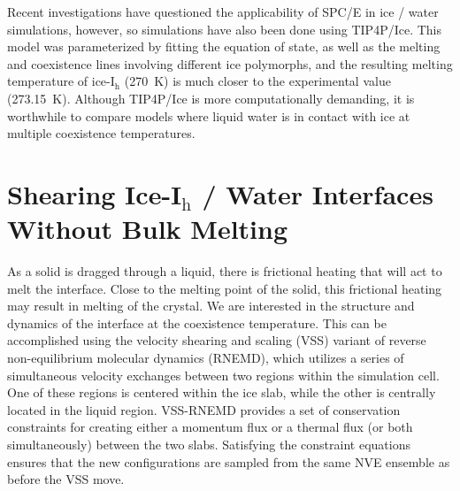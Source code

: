 Recent investigations have questioned the applicability of SPC/E in
ice / water
simulations,\cite{Vega2005c,Vega2011a,Gladich2012,Gallo2016} however,
so simulations have also been done using TIP4P/Ice.\cite{Abascal2005}
This model was parameterized by fitting the equation of state, as well
as the melting and coexistence lines involving different
ice polymorphs, and the resulting melting temperature of
ice-I$_\mathrm{h}$ (270~K) is much closer to the experimental
value (273.15~K).\cite{Abascal2005} Although TIP4P/Ice is more computationally
demanding, it is worthwhile to compare models where liquid water is in
contact with ice at multiple coexistence temperatures.

\section{Shearing Ice-I$_\mathrm{h}$ / Water Interfaces Without Bulk Melting}

As a solid is dragged through a liquid, there is frictional heating
that will act to melt the interface.  Close to the melting point of the
solid, this frictional heating may result in melting of the crystal.
We are interested in the structure and dynamics of the interface at
the coexistence temperature.  This can be accomplished using the velocity
shearing and scaling (VSS) variant of reverse non-equilibrium
molecular dynamics (RNEMD), which utilizes a series of simultaneous
velocity exchanges between two regions within the simulation
cell.\cite{Kuang2012} One of these regions is centered within the ice
slab, while the other is centrally located in the liquid
region. VSS-RNEMD provides a set of conservation constraints for
creating either a momentum flux or a thermal flux (or both
simultaneously) between the two slabs.  Satisfying the constraint
equations ensures that the new configurations are sampled from the
same NVE ensemble as before the VSS move.

